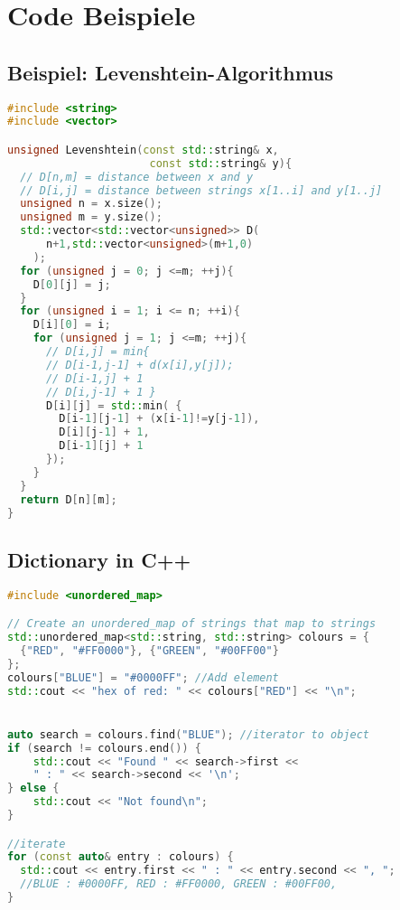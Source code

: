 \section{Code Beispiele}

\subsection{Beispiel: Levenshtein-Algorithmus}
\begin{lstlisting}[language=C++]
#include <string>
#include <vector>

unsigned Levenshtein(const std::string& x, 
                      const std::string& y){
  // D[n,m] = distance between x and y
  // D[i,j] = distance between strings x[1..i] and y[1..j]
  unsigned n = x.size();
  unsigned m = y.size();
  std::vector<std::vector<unsigned>> D(
      n+1,std::vector<unsigned>(m+1,0)
    );
  for (unsigned j = 0; j <=m; ++j){
    D[0][j] = j;
  }
  for (unsigned i = 1; i <= n; ++i){
    D[i][0] = i;
    for (unsigned j = 1; j <=m; ++j){
      // D[i,j] = min{ 
      // D[i-1,j-1] + d(x[i],y[j]);
      // D[i-1,j] + 1
      // D[i,j-1] + 1 }
      D[i][j] = std::min( {
        D[i-1][j-1] + (x[i-1]!=y[j-1]), 
        D[i][j-1] + 1, 
        D[i-1][j] + 1
      });
    }
  }
  return D[n][m];
}
\end{lstlisting}

\subsection{Dictionary in C++}
\begin{lstlisting}[language=C++]
#include <unordered_map>

// Create an unordered_map of strings that map to strings
std::unordered_map<std::string, std::string> colours = {
  {"RED", "#FF0000"}, {"GREEN", "#00FF00"}
};
colours["BLUE"] = "#0000FF"; //Add element
std::cout << "hex of red: " << colours["RED"] << "\n";


auto search = colours.find("BLUE"); //iterator to object
if (search != colours.end()) {
    std::cout << "Found " << search->first << 
    " : " << search->second << '\n';
} else {
    std::cout << "Not found\n";
}

//iterate
for (const auto& entry : colours) {
  std::cout << entry.first << " : " << entry.second << ", ";
  //BLUE : #0000FF, RED : #FF0000, GREEN : #00FF00,
}
\end{lstlisting}

